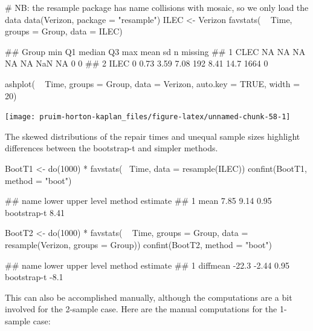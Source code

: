 \begin{Schunk}
\begin{Sinput}
# NB: the resample package has name collisions with mosaic, so we only load the data
data(Verizon, package = "resample")
ILEC <- Verizon %
favstats( ~ Time, groups = Group, data = ILEC)
\end{Sinput}
\begin{Soutput}
##   Group min   Q1 median   Q3 max mean   sd    n missing
## 1  CLEC  NA   NA     NA   NA  NA  NaN   NA    0       0
## 2  ILEC   0 0.73   3.59 7.08 192 8.41 14.7 1664       0
\end{Soutput}
\begin{Sinput}
 ashplot( ~ Time, groups = Group, data = Verizon, auto.key = TRUE, width = 20)
\end{Sinput}


\begin{center}\texttt{[image: pruim-horton-kaplan\_files/figure-latex/unnamed-chunk-58-1]} \end{center}

\end{Schunk}

\noindent
The skewed distributions of the repair times and unequal sample sizes
highlight differences between the bootstrap-t and simpler methods.

\begin{Schunk}
\begin{Sinput}
BootT1 <- do(1000) * favstats(~ Time, data = resample(ILEC))
confint(BootT1, method = "boot")
\end{Sinput}
\begin{Soutput}
##   name lower upper level      method estimate
## 1 mean  7.85  9.14  0.95 bootstrap-t     8.41
\end{Soutput}
\begin{Sinput}
BootT2 <- do(1000) * favstats( ~ Time, groups = Group, data = resample(Verizon, groups = Group))
confint(BootT2, method = "boot")
\end{Sinput}
\begin{Soutput}
##       name lower upper level      method estimate
## 1 diffmean -22.3 -2.44  0.95 bootstrap-t     -8.1
\end{Soutput}
\end{Schunk}

\noindent
This can also be accomplished manually, although the computations are a
bit involved for the 2-sample case. Here are the manual computations for
the 1-sample case:

